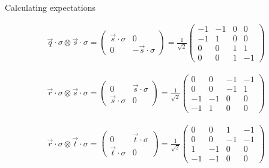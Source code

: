\documentclass[aspectratio=1610]{beamer}					%
\begin{document}
\begin{frame}{Calculating expectations}


\begin{align*}
\vec{q}\cdot\sigma\otimes\vec{s}\cdot\sigma = 
\begin{pmatrix}
\vec{s}\cdot\sigma & 0 \\
0 & -\vec{s}\cdot\sigma
\end{pmatrix} = 
\frac{1}{\sqrt{2}}\begin{pmatrix}
-1 & -1 & 0 & 0\\
-1 & 1 & 0 & 0\\
0 & 0 & 1 & 1 \\
0 & 0 & 1 & -1
\end{pmatrix}
\end{align*}

\begin{align*}
\vec{r}\cdot\sigma\otimes\vec{s}\cdot\sigma = 
\begin{pmatrix}
0 & \vec{s}\cdot\sigma\\
\vec{s}\cdot\sigma & 0
\end{pmatrix} = 
\frac{1}{\sqrt{2}}\begin{pmatrix}
0 & 0 & -1 & -1\\
0 & 0 & -1 & 1\\
-1 & -1 & 0 & 0 \\
-1 & 1 & 0 & 0
\end{pmatrix}
\end{align*}


\begin{align*}
\vec{r}\cdot\sigma\otimes\vec{t}\cdot\sigma = 
\begin{pmatrix}
0 & \vec{t}\cdot\sigma \\
\vec{t}\cdot\sigma & 0
\end{pmatrix} = 
\frac{1}{\sqrt{2}}\begin{pmatrix}
0 & 0 & 1 & -1\\
0 & 0 & -1 & -1\\
1 & -1 & 0 & 0 \\
-1 & -1 & 0 & 0
\end{pmatrix}
\end{align*}



\end{frame}
\end{document}
